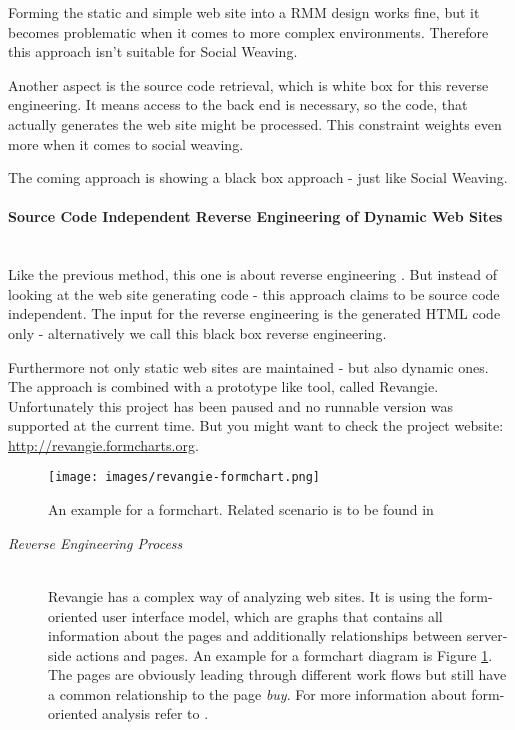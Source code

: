 \begin{enumerate}[A.]
\begin{description}
		Forming the static and simple web site into a RMM design works fine, but it becomes problematic when it comes to more complex environments. Therefore this approach isn't suitable for Social Weaving.
		
		Another aspect is the source code retrieval, which is white box for this reverse engineering. It means access to the back end is necessary, so the code, that actually generates the web site might be processed. This constraint weights even more when it comes to social weaving.
		
		The coming approach is showing a black box approach - just like Social Weaving. 
	\end{description}	 

	\paragraph{Source Code Independent Reverse Engineering of Dynamic Web Sites}\mbox{}\\ 	
	Like the previous method, this one is about reverse engineering \cite{draheim2005source}. But instead of looking at the web site generating code - this approach claims to be source code independent. The input for the reverse engineering is the generated HTML code only - alternatively we call this black box reverse engineering.
	
	Furthermore not only static web sites are maintained - but also dynamic ones. The approach is combined with a prototype like tool, called Revangie\cite{draheim2004generator}. Unfortunately this project has been paused and no runnable version was supported at the current time. But you might want to check the project website: \url{http://revangie.formcharts.org}. 
	
	\begin{figure}\centering
			\texttt{[image: images/revangie-formchart.png]}
			\caption{An example for a formchart. Related scenario is to be found in \cite{draheim2005source}}
			\label{revangie-formchart}
	\end{figure} 
	
	\begin{description}
		\item[\emph{Reverse Engineering Process}]\mbox{}\\ 
		Revangie has a complex way of analyzing web sites. It is using the form-oriented user interface model, which are graphs that contains all information about the pages and additionally relationships between server-side actions and pages. An example for a formchart diagram is Figure \ref{revangie-formchart}. The pages are obviously leading through different work flows but still have a common relationship to the page \emph{buy}. For more information about form-oriented analysis refer to \cite{draheim2005form}. 
		

\end{description}
\end{enumerate}
